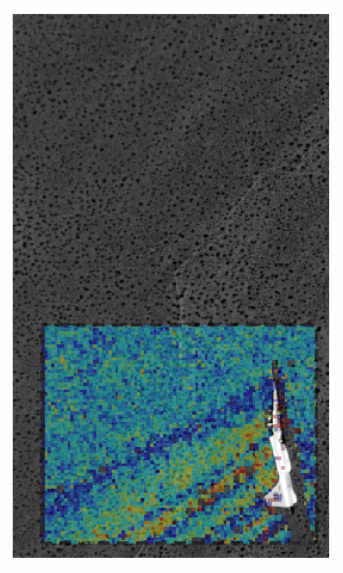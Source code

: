 \documentclass[letterpaper,12pt]{article}
\begin{document}
\begin{figure}[h]
    \centering
    \begin{subfigure}[b]{0.3\textwidth}
    	\centering
        \includegraphics[width=0.95\textwidth]{AirBOS_X_Displacement.PNG}
        \caption{}
        \label{fig:AirBOS_X_Displacement}
    \end{subfigure}
    \begin{subfigure}[b]{0.3\textwidth}
    	\centering

\end{subfigure}
\end{figure}
\end{document}
